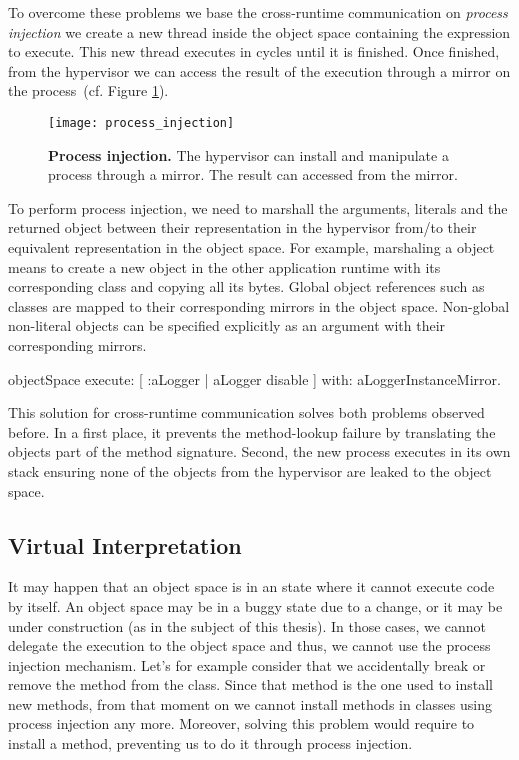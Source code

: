 To overcome these problems we base the cross-runtime communication on \emph{process injection} \ie we create a new thread inside the object space containing the expression to execute. This new thread executes in cycles until it is finished. Once finished, from the hypervisor we can access the result of the execution through a mirror on the process~(cf. Figure \ref{fig:process_injection}).

\begin{figure}[ht]
\center
\texttt{[image: process\_injection]}
\caption{\textbf{Process injection.} The hypervisor can install and manipulate a process through a mirror. The result can accessed from the mirror.\label{fig:process_injection}}
\end{figure}

To perform process injection, we need to marshall the arguments, literals and the returned object between their representation in the hypervisor from/to their equivalent representation in the object space. For example, marshaling a  object means to create a new  object in the other application runtime with its corresponding class and copying all its bytes. Global object references such as classes are mapped to their corresponding mirrors in the object space. Non-global non-literal objects can be specified explicitly as an argument with their corresponding mirrors.

\begin{code}
objectSpace
	execute: [ :aLogger | aLogger disable ]
	with: aLoggerInstanceMirror.
\end{code}

This solution for cross-runtime communication solves both problems observed before. In a first place, it prevents the method-lookup failure by translating the objects part of the method signature. Second, the new process executes in its own stack ensuring none of the objects from the hypervisor are leaked to the object space.

\subsection{Virtual Interpretation} \label{sec:interpretation}

It may happen that an object space is in an state where it cannot execute code by itself. An object space may be in a buggy state due to a change, or it may be under construction (as in the subject of this thesis). In those cases, we cannot delegate the execution to the object space and thus, we cannot use the process injection mechanism. Let's for example consider that we accidentally break or remove the  method from the  class. Since that method is the one used to install new methods, from that moment on we cannot install methods in classes using process injection any more. Moreover, solving this problem would require to install a method, preventing us to do it through process injection.

